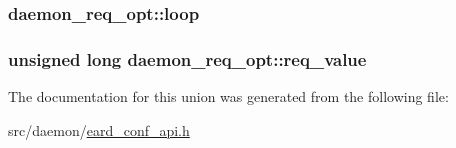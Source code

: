 \subsubsection[{\texorpdfstring{loop}{loop}}]{ daemon\+\_\+req\+\_\+opt\+::loop}\hypertarget{uniondaemon__req__opt_a44456b549010fac1132f44152d46027a}{}\label{uniondaemon__req__opt_a44456b549010fac1132f44152d46027a}
\subsubsection[{\texorpdfstring{req\+\_\+value}{req_value}}]{\setlength{\rightskip}{0pt plus 5cm}unsigned long daemon\+\_\+req\+\_\+opt\+::req\+\_\+value}\hypertarget{uniondaemon__req__opt_a0f428451371a39762fc8b51d8b010f84}{}\label{uniondaemon__req__opt_a0f428451371a39762fc8b51d8b010f84}


The documentation for this union was generated from the following file\+:\begin{DoxyCompactItemize}
\item 
src/daemon/\hyperlink{eard__conf__api_8h}{eard\+\_\+conf\+\_\+api.\+h}\end{DoxyCompactItemize}
